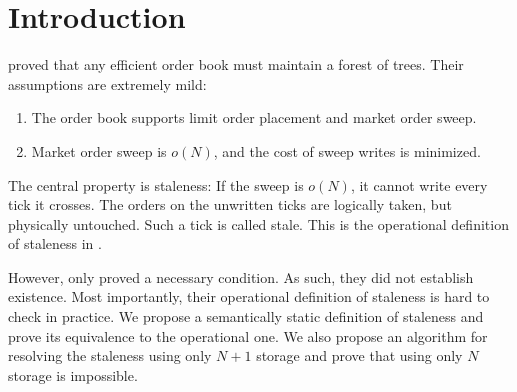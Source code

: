 \section{Introduction} \label{sec:intro}
\textcite{axiomatch2026planetree} proved that any efficient order book must maintain a forest of trees. Their assumptions are extremely mild:
\begin{enumerate}
    \item The order book supports limit order placement and market order sweep.
    \item Market order sweep is $o(N)$, and the cost of sweep writes is minimized.
\end{enumerate}
The central property is staleness: If the sweep is $o(N)$, it cannot write every tick it crosses. The orders on the unwritten ticks are logically taken, but physically untouched. Such a tick is called stale. This is the operational definition of staleness in \textcite{axiomatch2026planetree}.

However, \textcite{axiomatch2026planetree} only proved a necessary condition. As such, they did not establish existence. Most importantly, their operational definition of staleness is hard to check in practice. We propose a semantically static definition of staleness and prove its equivalence to the operational one. We also propose an algorithm for resolving the staleness using only $N+1$ storage and prove that using only $N$ storage is impossible.
